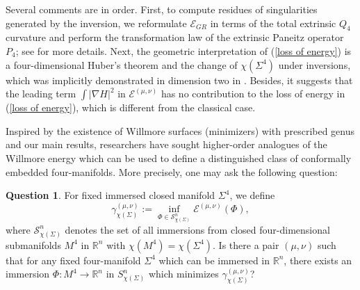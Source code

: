 \documentclass[11pt,letterpaper]{amsart}
\newcommand{\mE}{\mathcal{E}}
\theoremstyle{definition}
\newtheorem{question}[theorem]{Question}
\theoremstyle{remark}
\numberwithin{equation}{section}
\begin{document}
Several comments are in order. First, to compute residues of singularities generated by the inversion, we reformulate $\mE_{GR}$ in terms of the total extrinsic $Q_4$ curvature and perform the transformation law of the extrinsic Paneitz operator $P_4$; see \cite{Case-Graham-Kuo} for more details. Next, the geometric interpretation of (\ref{loss of energy}) is a four-dimensional Huber's theorem and the change of $\chi(\Sigma^4)$ under inversions, which was implicitly demonstrated in dimension two in \cite{Kuwert-SchatzleS04}. Besides, it suggests that the leading term $\int |\nabla H|^2$ in $\mE^{(\mu,\nu)}$ has no contribution to the loss of energy in (\ref{loss of energy}), which is different from the classical case. 


Inspired by the existence of Willmore surfaces (minimizers) with prescribed genus \cite{Bauer-Kuwert03,Simon93} and our main results, researchers have sought higher-order analogues of the Willmore energy which can be used to define a distinguished class of conformally embedded four-manifolds. More precisely, one may ask the following question:
\begin{question}
For fixed immersed closed manifold $\Sigma^4$, we define  
\begin{equation*}
    \gamma^{(\mu, \nu)}_{\chi(\Sigma)} := \inf_{\Phi \in \mathcal{S}^n_{\chi(\Sigma)}} \mE^{(\mu, \nu)} (\Phi),
\end{equation*}
where $\mathcal{S}^n_{\chi(\Sigma)}$ denotes the set of all immersions from closed four-dimensional submanifolds $M^4$ in $\mathbb{R}^n$ with $\chi(M^4)=\chi(\Sigma^4)$. Is there a pair $(\mu,\nu)$ such that for any fixed four-manifold $\Sigma^4$ which can be immersed in $\mathbb{R}^n$, there exists an immersion $\Phi \colon M^4 \to \mathbb{R}^n$ in $S_{\chi(\Sigma)}^n$ which minimizes $\gamma^{(\mu, \nu)}_{\chi(\Sigma)}$?
\end{question}
\end{document}
